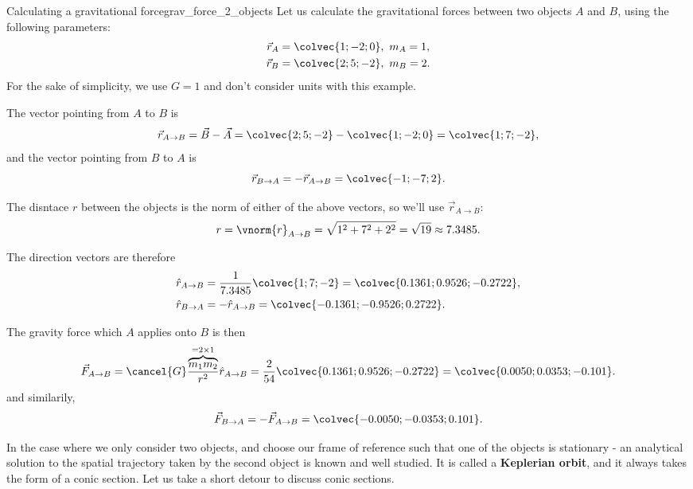 \begin{example}{Calculating a gravitational force}{grav_force_2_objects}
  Let us calculate the gravitational forces between two objects $A$ and $B$, using the following parameters:
  \begin{align*}
    \vec{r}_{A}&=\colvec{1;-2;0},\ m_{A} = 1,\\
    \vec{r}_{B}&=\colvec{2;5;-2},\ m_{B} = 2.
  \end{align*}
  For the sake of simplicity, we use $G=1$ and don't consider units with this example.

  The vector pointing from $A$ to $B$ is
  \[
    \vec{r}_{A\to B} = \vec{B}-\vec{A} = \colvec{2;5;-2} - \colvec{1;-2;0} = \colvec{1;7;-2},
  \]
  and the vector pointing from $B$ to $A$ is
  \[
    \vec{r}_{B\to A} = -\vec{r}_{A\to B} = \colvec{-1;-7;2}.
  \]

  The disntace $r$ between the objects is the norm of either of the above vectors, so we'll use $\vec{r}_{A\to B}$:
  \[
    r = \vnorm{r}_{A\to B} = \sqrt{1^{2}+7^{2}+2^{2}} = \sqrt{19} \approx 7.3485.
  \]

  The direction vectors are therefore
  \begin{align*}
    \hat{r}_{A\to B} &= \frac{1}{7.3485}\colvec{1;7;-2} = \colvec{0.1361;0.9526;-0.2722},\\
    \hat{r}_{B\to A} &= -\hat{r}_{A\to B} = \colvec{-0.1361;-0.9526;0.2722}.
  \end{align*}

  The gravity force which $A$ applies onto $B$ is then
  \[
    \vec{F}_{A\to B} = \cancel{G}\frac{\overbrace{m_{1}m_{2}}^{=2\times1}}{r^{2}}\hat{r}_{A\to B} = \frac{2}{54}\colvec{0.1361;0.9526;-0.2722} = \colvec{0.0050;0.0353;-0.101}.
  \]
  and similarily,
  \[
    \vec{F}_{B\to A} = -\vec{F}_{A\to B} = \colvec{-0.0050;-0.0353;0.101}.
  \]
\end{example}

In the case where we only consider two objects, and choose our frame of reference such that one of the objects is stationary - an analytical solution to the spatial trajectory taken by the second object is known and well studied. It is called a \textbf{Keplerian orbit}, and it always takes the form of a conic section. Let us take a short detour to discuss conic sections.

